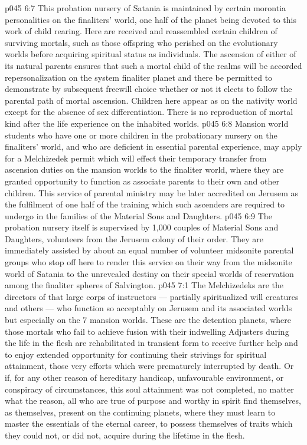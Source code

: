 \vs p045 6:7 \pc This probation nursery of Satania is maintained by certain morontia personalities on the finaliters’ world, one half of the planet being devoted to this work of child rearing. Here are received and reassembled certain children of surviving mortals, such as those offspring who perished on the evolutionary worlds before acquiring spiritual status as individuals. The ascension of either of its natural parents ensures that such a mortal child of the realms will be accorded repersonalization on the system finaliter planet and there be permitted to demonstrate by subsequent freewill choice whether or not it elects to follow the parental path of mortal ascension. Children here appear as on the nativity world except for the absence of sex differentiation. There is no reproduction of mortal kind after the life experience on the inhabited worlds.
\vs p045 6:8 Mansion world students who have one or more children in the probationary nursery on the finaliters’ world, and who are deficient in essential parental experience, may apply for a Melchizedek permit which will effect their temporary transfer from ascension duties on the mansion worlds to the finaliter world, where they are granted opportunity to function as associate parents to their own and other children. This service of parental ministry may be later accredited on Jerusem as the fulfilment of one half of the training which such ascenders are required to undergo in the families of the Material Sons and Daughters.
\vs p045 6:9 The probation nursery itself is supervised by 1,000 couples of Material Sons and Daughters, volunteers from the Jerusem colony of their order. They are immediately assisted by about an equal number of volunteer midsonite parental groups who stop off here to render this service on their way from the midsonite world of Satania to the unrevealed destiny on their special worlds of reservation among the finaliter spheres of Salvington.
\vs p045 7:1 The Melchizedeks are the directors of that large corps of instructors --- partially spiritualized will creatures and others --- who function so acceptably on Jerusem and its associated worlds but especially on the 7 mansion worlds. These are the detention planets, where those mortals who fail to achieve fusion with their indwelling Adjusters during the life in the flesh are rehabilitated in transient form to receive further help and to enjoy extended opportunity for continuing their strivings for spiritual attainment, those very efforts which were prematurely interrupted by death. Or if, for any other reason of hereditary handicap, unfavourable environment, or conspiracy of circumstances, this soul attainment was not completed, no matter what the reason, all who are true of purpose and worthy in spirit find themselves, as themselves, present on the continuing planets, where they must learn to master the essentials of the eternal career, to possess themselves of traits which they could not, or did not, acquire during the lifetime in the flesh.
